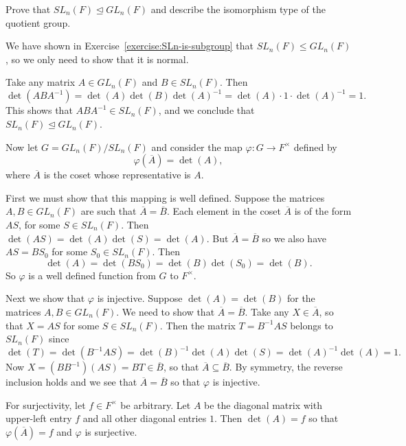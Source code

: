 \label{exercise:quotient-group:GL-mod-SL}
Prove that $SL_n(F)\trianglelefteq GL_n(F)$ and describe the
isomorphism type of the quotient group.
\begin{solution}
  We have shown in Exercise~\ref{exercise:SLn-is-subgroup} that
  $SL_n(F)\leq GL_n(F)$, so we only need to show that it is normal.

  Take any matrix $A\in GL_n(F)$ and $B\in SL_n(F)$. Then
  \begin{equation*}
    \det(ABA^{-1})
    = \det(A)\det(B)\det(A)^{-1}
    = \det(A)\cdot1\cdot\det(A)^{-1}
    = 1.
  \end{equation*}
  This shows that $ABA^{-1}\in SL_n(F)$, and we conclude that
  $SL_n(F)\trianglelefteq GL_n(F)$.

  Now let $G = GL_n(F)/SL_n(F)$ and consider the map
  $\varphi\colon G\to F^\times$ defined by
  \begin{equation*}
    \varphi(\overline{A}) = \det(A),
  \end{equation*}
  where $\overline{A}$ is the coset whose representative is $A$.

  First we must show that this mapping is well defined. Suppose the
  matrices $A,B\in GL_n(F)$ are such that
  $\overline{A} = \overline{B}$. Each element in the coset
  $\overline{A}$ is of the form $AS$, for some $S\in SL_n(F)$. Then
  $\det(AS) = \det(A)\det(S) = \det(A)$. But
  $\overline{A} = \overline{B}$ so we also have $AS = BS_0$ for some
  $S_0\in SL_n(F)$. Then
  \begin{equation*}
    \det(A) = \det(BS_0) = \det(B)\det(S_0) = \det(B).
  \end{equation*}
  So $\varphi$ is a well defined function from $G$ to $F^\times$.

  Next we show that $\varphi$ is injective. Suppose
  $\det(A) = \det(B)$ for the matrices $A,B\in GL_n(F)$. We need to
  show that $\overline{A} = \overline{B}$. Take any
  $X\in\overline{A}$, so that $X = AS$ for some $S\in SL_n(F)$. Then
  the matrix $T = B^{-1}AS$ belongs to $SL_n(F)$ since
  \begin{equation*}
    \det(T) = \det(B^{-1}AS)
    = \det(B)^{-1}\det(A)\det(S) = \det(A)^{-1}\det(A) = 1.
  \end{equation*}
  Now $X = (BB^{-1})(AS) = BT\in\overline{B}$, so that
  $\overline{A}\subseteq\overline{B}$. By symmetry, the reverse
  inclusion holds and we see that $\overline{A} = \overline{B}$ so
  that $\varphi$ is injective.

  For surjectivity, let $f\in F^\times$ be arbitrary. Let $A$ be the
  diagonal matrix with upper-left entry $f$ and all other diagonal
  entries $1$. Then $\det(A) = f$ so that $\varphi(\overline{A}) = f$
  and $\varphi$ is surjective.


\end{solution}
